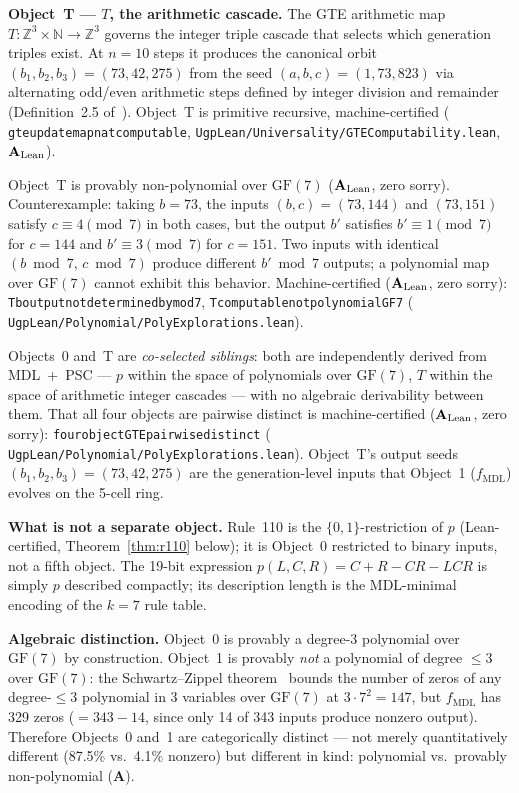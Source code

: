 \documentclass[11pt]{article}
\theoremstyle{remark}
\newcommand{\GF}[1]{\ensuremath{\mathrm{GF}(#1)}}
\newcommand{\lean}[1]{%
  \penalty-100
  \begingroup\def\_{\textunderscore\allowbreak}\texttt{#1}\endgroup}
\newcommand{\fmdl}{\ensuremath{f_{\mathrm{MDL}}}}
\newcommand{\CatA}{\textbf{A}}
\newcommand{\CatAL}{\texorpdfstring{\ensuremath{\textbf{A}_{\rm Lean}}}{A-Lean}}
\begin{document}
\medskip
\noindent\textbf{Object~T --- $T$, the arithmetic cascade.}
The GTE arithmetic map $T: \mathbb{Z}^3 \times \mathbb{N} \to \mathbb{Z}^3$
governs the integer triple cascade that selects which generation triples exist.
At $n = 10$ steps it produces the canonical orbit
$(b_1, b_2, b_3) = (73, 42, 275)$ from the seed $(a, b, c) = (1, 73, 823)$
via alternating odd/even arithmetic steps defined by integer division and
remainder (Definition~2.5 of~\cite{SpivackGTEMobius}).
Object~T is primitive recursive, machine-certified
(\lean{gte\_update\_map\_nat\_computable},
\lean{UgpLean/Universality/GTEComputability.lean}, \CatAL{}).

Object~T is provably non-polynomial over $\GF{7}$ (\CatAL{}, zero sorry).
Counterexample: taking $b = 73$, the inputs $(b, c) = (73, 144)$ and
$(73, 151)$ satisfy $c \equiv 4 \pmod{7}$ in both cases, but the output
$b'$ satisfies $b' \equiv 1 \pmod{7}$ for $c = 144$ and
$b' \equiv 3 \pmod{7}$ for $c = 151$.
Two inputs with identical $(b \bmod 7,\, c \bmod 7)$ produce different
$b' \bmod 7$ outputs; a polynomial map over $\GF{7}$ cannot exhibit this
behavior.
Machine-certified (\CatAL{}, zero sorry):
\lean{T\_b\_output\_not\_determined\_by\_mod7},
\lean{T\_computable\_not\_polynomial\_GF7}
(\lean{UgpLean/Polynomial/PolyExplorations.lean}).

Objects~0 and~T are \emph{co-selected siblings}: both are independently
derived from MDL~+~PSC --- $p$ within the space of polynomials over $\GF{7}$,
$T$ within the space of arithmetic integer cascades --- with no algebraic
derivability between them. That all four objects are pairwise distinct is
machine-certified (\CatAL{}, zero sorry):
\lean{four\_object\_GTE\_pairwise\_distinct}
(\lean{UgpLean/Polynomial/PolyExplorations.lean}).
Object~T's output seeds $(b_1, b_2, b_3) = (73, 42, 275)$
are the generation-level inputs that Object~1 ($\fmdl{}$) evolves on the 5-cell ring.

\medskip
\noindent\textbf{What is not a separate object.}
Rule~110 is the $\{0,1\}$-restriction of $p$ (Lean-certified, Theorem~\ref{thm:r110}
below); it is Object~0 restricted to binary inputs, not a fifth object.
The 19-bit expression $p(L,C,R) = C+R-CR-LCR$ is simply $p$ described compactly;
its description length is the MDL-minimal encoding of the $k{=}7$ rule table.

\medskip
\noindent\textbf{Algebraic distinction.}
Object~0 is provably a degree-3 polynomial over $\GF{7}$ by construction.
Object~1 is provably \emph{not} a polynomial of degree ${\leq}3$ over $\GF{7}$:
the Schwartz--Zippel theorem~\cite{Schwartz1980,Zippel1979} bounds the number
of zeros of any degree-${\leq}3$ polynomial in 3 variables over $\GF{7}$ at
$3 \cdot 7^2 = 147$, but $\fmdl{}$
has 329 zeros ($= 343 - 14$, since only 14 of 343 inputs produce nonzero output).
Therefore Objects~0 and~1 are categorically
distinct --- not merely quantitatively different (87.5\% vs.\ 4.1\% nonzero)
but different in kind: polynomial vs.\ provably non-polynomial (\CatA{}).
\end{document}
